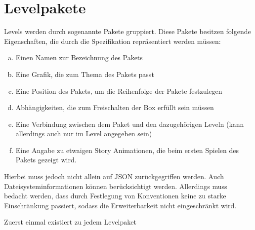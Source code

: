 \section{Levelpakete}
Levels werden durch sogenannte Pakete gruppiert.
Diese Pakete besitzen folgende Eigenschaften, die durch die Spezifikation repräsentiert werden müssen:
\begin{enumerate}[a)]
	\item Einen Namen zur Bezeichnung des Pakets
	\item Eine Grafik, die zum Thema des Pakets passt
	\item Eine Position des Pakets, um die Reihenfolge der Pakete festzulegen
	\item Abhängigkeiten, die zum Freischalten der Box erfüllt sein müssen
	\item Eine Verbindung zwischen dem Paket und den dazugehörigen Leveln (kann allerdings auch nur im Level angegeben sein)
	\item Eine Angabe zu etwaigen Story Animationen, die beim ersten Spielen des Pakets gezeigt wird.
\end{enumerate}
Hierbei muss jedoch nicht allein auf JSON zurückgegriffen werden.
Auch Dateisysteminformationen können berücksichtigt werden.
Allerdings muss bedacht werden, dass durch Festlegung von Konventionen keine zu starke Einschränkung passiert, sodass die Erweiterbarkeit nicht eingeschränkt wird.

Zuerst einmal existiert zu jedem Levelpaket 
